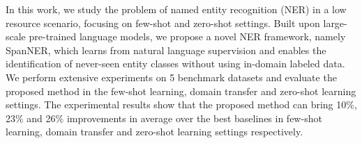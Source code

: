 In this work, we study the problem of named entity recognition (NER)  in a low resource scenario, focusing on few-shot and zero-shot settings. Built upon large-scale pre-trained language models, we propose a novel NER framework, namely SpanNER,  which learns from natural language supervision and enables the identification of never-seen entity classes without using in-domain labeled data. We perform  extensive experiments on 5 benchmark datasets and evaluate the proposed method in the few-shot learning, domain transfer and zero-shot learning settings. The experimental results show that the proposed method can bring  10\%, 23\% and 26\%  improvements in average over the best baselines in few-shot learning, domain transfer and zero-shot learning settings respectively.
